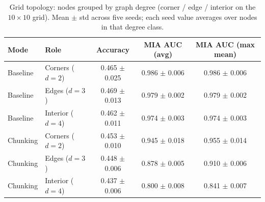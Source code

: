 \begin{table}[t]
  \centering
  \caption{Grid topology: nodes grouped by graph degree (corner / edge / interior on the $10{\times}10$ grid). Mean $\pm$ std across five seeds; each seed value averages over nodes in that degree class.}
  \label{tab:grid_degree_roles}
  \begin{tabular}{@{}l l ccc@{}}
    \toprule
    Mode & Role & Accuracy & MIA AUC (avg) & MIA AUC (max mean)\tabularnewline
    \midrule
    Baseline & Corners ($d{=}2$) & 0.465 $\pm$ 0.025 & 0.986 $\pm$ 0.006 & 0.986 $\pm$ 0.006\tabularnewline
    Baseline & Edges ($d{=}3$) & 0.469 $\pm$ 0.013 & 0.979 $\pm$ 0.002 & 0.979 $\pm$ 0.002\tabularnewline
    Baseline & Interior ($d{=}4$) & 0.462 $\pm$ 0.011 & 0.974 $\pm$ 0.003 & 0.974 $\pm$ 0.003\tabularnewline
    \midrule
    Chunking & Corners ($d{=}2$) & 0.453 $\pm$ 0.010 & 0.945 $\pm$ 0.018 & 0.955 $\pm$ 0.014\tabularnewline
    Chunking & Edges ($d{=}3$) & 0.448 $\pm$ 0.006 & 0.878 $\pm$ 0.005 & 0.910 $\pm$ 0.006\tabularnewline
    Chunking & Interior ($d{=}4$) & 0.437 $\pm$ 0.006 & 0.800 $\pm$ 0.008 & 0.841 $\pm$ 0.007\tabularnewline
    \bottomrule
  \end{tabular}
\end{table}
